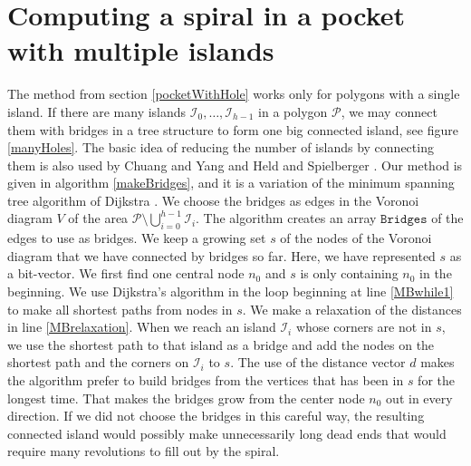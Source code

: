 \documentclass[3p]{elsarticle}
\newcommand{\PP}{\mathcal{P}}
\newcommand{\HH}{\mathcal{I}}
\newcommand{\bridges}{\texttt{Bridges}}
\begin{document}
\section{Computing a spiral in a pocket with multiple islands}\label{multipleHoles}

\begin{figure*}
\centering
{}\quad
{}
\caption{
 A polygon with 13 islands. The bridges chosen among the Voronoi
edges to connect the islands are blue. The remaining Voronoi edges are red.
 The resulting spiral around the islands.
}
\label{manyHoles}
\end{figure*}

The method from section \ref{pocketWithHole} works only for polygons with a single island.
If there are many islands $\HH_0,\ldots,\HH_{h-1}$ in a polygon $\PP$,
we may connect them with bridges in a tree structure to form one
big connected island, see figure \ref{manyHoles}.
The basic idea of reducing the number of islands by connecting them is also used
by Chuang and Yang \cite{chuang2007} and Held and Spielberger \cite{held2014}.
Our method is given in algorithm \ref{makeBridges}, and it is a variation of the minimum spanning
tree algorithm of Dijkstra \cite{dijkstra1959}.
We choose the bridges as edges in the Voronoi diagram $V$ of the area
$\PP\setminus \bigcup_{i=0}^{h-1}\HH_i$.
The algorithm creates an array $\bridges$ of the edges to use as bridges.
We keep a growing set $s$ of the nodes of the Voronoi diagram that we have
connected by bridges so far. Here, we have represented $s$ as a bit-vector.
We first find one central node $n_0$ and $s$ is only containing $n_0$ in the beginning.
We use Dijkstra's algorithm \cite{dijkstra1959} in the loop beginning at line \ref{MBwhile1}
to make all shortest paths from nodes in $s$. We make a relaxation of the distances in line \ref{MBrelaxation}. When we reach
an island $\HH_i$ whose corners are not in $s$,
we use the shortest path to that island as a bridge and add the nodes on the shortest path
and the corners on $\HH_i$ to $s$. The use of the distance vector $d$ makes the algorithm
prefer to build bridges from the vertices that has been in $s$ for the longest time.
That makes the bridges grow from the center node $n_0$ out in every direction.
If we did not choose the bridges in this careful way, the resulting connected island
would possibly make unnecessarily long dead ends that would require many
revolutions to fill out by the spiral.
\end{document}
